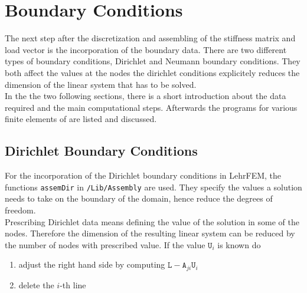 
\chapter{Boundary Conditions} \label{chap:bound} 




 The next step after the discretization and assembling of the stiffness matrix and load vector is the incorporation of the boundary data. There are two different types of boundary conditions, Dirichlet and Neumann boundary conditions. They both affect the values at the nodes the dirichlet conditions explicitely reduces the dimension of the linear system that has to be solved. \\

 In the the two following sections, there is a short introduction about the data required and the main computational steps. Afterwards the \MATLAB programs for various finite elements of \LIBNAME are listed and discussed.



\section{Dirichlet Boundary Conditions} \label{sect:assem_dir} 

 For the incorporation of the Dirichlet boundary conditions in LehrFEM, the functions {\tt assemDir} in {\tt /Lib/Assembly} are used. They specify the values a solution needs to take on the boundary of the domain, hence reduce the degrees of freedom. \\
 
 Prescribing Dirichlet data means defining the value of the solution in some of the nodes. Therefore the dimension of the resulting linear system can be reduced by the number of nodes with prescribed value. If the value $\mathtt U_i$ is known do
\begin{enumerate}
 \item adjust the right hand side by computing $\mathtt L - \mathtt A_{ji} \mathtt U_i$
\item delete the $i$-th line
\end{enumerate}




